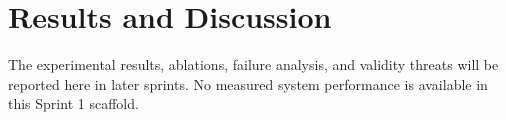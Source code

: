 \section{Results and Discussion}
\label{sec:results}
The experimental results, ablations, failure analysis, and validity threats
will be reported here in later sprints. No measured system performance is
available in this Sprint 1 scaffold.
